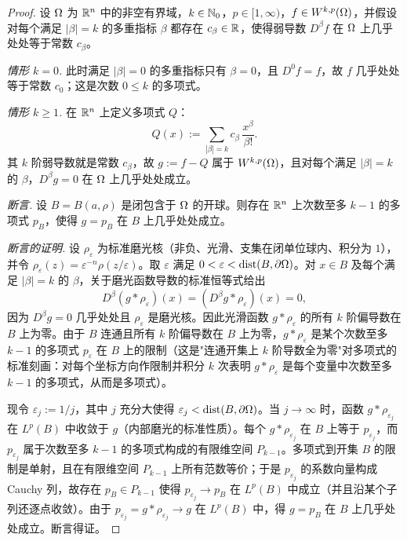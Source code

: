 \begin{proof}
设 $\Omega$ 为 $\mathbb{R}^n$ 中的非空有界域，$k\in\mathbb{N}_0$，$p\in[1,\infty)$，$f\in W^{k,p}(\Omega)$，并假设对每个满足 $|\beta|=k$ 的多重指标 $\beta$ 都存在 $c_\beta\in\mathbb{R}$，使得弱导数 $D^\beta f$ 在 $\Omega$ 上几乎处处等于常数 $c_\beta$。

\emph{情形 $k=0$.} 此时满足 $|\beta|=0$ 的多重指标只有 $\beta=0$，且 $D^0f=f$，故 $f$ 几乎处处等于常数 $c_0$；这是次数 $0\le k$ 的多项式。

\emph{情形 $k\ge 1$.} 在 $\mathbb{R}^n$ 上定义多项式 $Q$：
\[
  Q(x):=\sum_{|\beta|=k} c_\beta\,\frac{x^\beta}{\beta!} .
\]
其 $k$ 阶弱导数就是常数 $c_\beta$，故 $g:=f-Q$ 属于 $W^{k,p}(\Omega)$，且对每个满足 $|\beta|=k$ 的 $\beta$，$D^\beta g=0$ 在 $\Omega$ 上几乎处处成立。

\emph{断言.} 设 $B=B(a,\rho)$ 是闭包含于 $\Omega$ 的开球。则存在 $\mathbb{R}^n$ 上次数至多 $k-1$ 的多项式 $p_B$，使得 $g=p_B$ 在 $B$ 上几乎处处成立。

\emph{断言的证明.} 设 $\rho_\varepsilon$ 为标准磨光核（非负、光滑、支集在闭单位球内、积分为 $1$），并令 $\rho_\varepsilon(z)=\varepsilon^{-n}\rho(z/\varepsilon)$。取 $\varepsilon$ 满足 $0<\varepsilon<\operatorname{dist}(B,\partial\Omega)$。对 $x\in B$ 及每个满足 $|\beta|=k$ 的 $\beta$，关于磨光函数导数的标准恒等式给出
\[
  D^\beta(g*\rho_\varepsilon)(x)=(D^\beta g*\rho_\varepsilon)(x)=0 ,
\]
因为 $D^\beta g=0$ 几乎处处且 $\rho_\varepsilon$ 是磨光核。因此光滑函数 $g*\rho_\varepsilon$ 的所有 $k$ 阶偏导数在 $B$ 上为零。由于 $B$ 连通且所有 $k$ 阶偏导数在 $B$ 上为零，$g*\rho_\varepsilon$ 是某个次数至多 $k-1$ 的多项式 $p_\varepsilon$ 在 $B$ 上的限制（这是"连通开集上 $k$ 阶导数全为零"对多项式的标准刻画：对每个坐标方向作限制并积分 $k$ 次表明 $g*\rho_\varepsilon$ 是每个变量中次数至多 $k-1$ 的多项式，从而是多项式）。

现令 $\varepsilon_j:=1/j$，其中 $j$ 充分大使得 $\varepsilon_j<\operatorname{dist}(B,\partial\Omega)$。当 $j\to\infty$ 时，函数 $g*\rho_{\varepsilon_j}$ 在 $L^p(B)$ 中收敛于 $g$（内部磨光的标准性质）。每个 $g*\rho_{\varepsilon_j}$ 在 $B$ 上等于 $p_{\varepsilon_j}$，而 $p_{\varepsilon_j}$ 属于次数至多 $k-1$ 的多项式构成的有限维空间 $P_{k-1}$。多项式到开集 $B$ 的限制是单射，且在有限维空间 $P_{k-1}$ 上所有范数等价；于是 $p_{\varepsilon_j}$ 的系数向量构成 Cauchy 列，故存在 $p_B\in P_{k-1}$ 使得 $p_{\varepsilon_j}\to p_B$ 在 $L^p(B)$ 中成立（并且沿某个子列还逐点收敛）。由于 $p_{\varepsilon_j}=g*\rho_{\varepsilon_j}\to g$ 在 $L^p(B)$ 中，得 $g=p_B$ 在 $B$ 上几乎处处成立。断言得证。


\end{proof}
